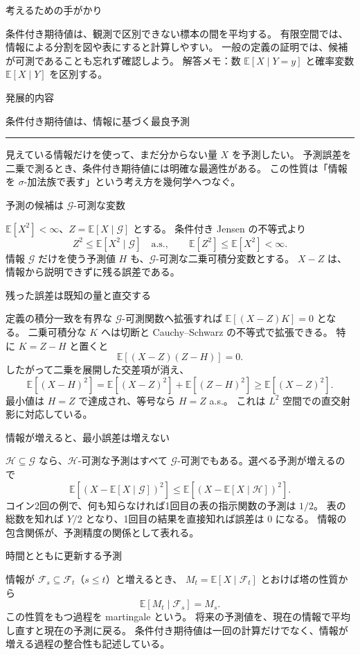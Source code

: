 \documentclass[a4paper,10pt,pdflatex,ja=standard,jafont=ipaex-type1,
  magstyle=real,scale=1]{bxjsarticle}
\newcommand{\coursename}{確率論と統計学 I}
\newcommand{\topic}[1]{\par\vspace{5pt}
  {\large\sffamily\mdseries\color{accent}#1}\par\vspace{2pt}}
\newcommand{\columnheading}[1]{\par\vspace{5pt}
  {\fontsize{11pt}{15pt}\selectfont\sffamily\mdseries\color{accent}#1}\par\vspace{2pt}}
\newcommand{\columnstart}[1]{\clearpage
  \setlength{\parskip}{2.5pt}
  \fancyhead[L]{\small\color{ink}\coursename{}・発展的内容}
  {\small\sffamily\mdseries\color{accent}発展的内容}\par\vspace{4pt}
  {\Large\color{ink}#1}\par\vspace{2pt}
  {\color{accent}\rule{\linewidth}{0.7pt}}\par\vspace{4pt}}
\newcommand{\F}{\mathcal F}
\newcommand{\E}{\mathbb E}
\begin{document}
\topic{考えるための手がかり}
条件付き期待値は、観測で区別できない標本の間を平均する。
有限空間では、情報による分割を図や表にすると計算しやすい。
一般の定義の証明では、候補が可測であることも忘れず確認しよう。
\vfill
{\small\color{muted}解答メモ：数 $\E[X\mid Y=y]$ と確率変数 $\E[X\mid Y]$ を区別する。}

\columnstart{条件付き期待値は、情報に基づく最良予測}
見えている情報だけを使って、まだ分からない量 $X$ を予測したい。
予測誤差を二乗で測るとき、条件付き期待値には明確な最適性がある。
この性質は「情報を $\sigma$-加法族で表す」という考え方を幾何学へつなぐ。

\columnheading{予測の候補は $\mathcal G$-可測な変数}
$\E[X^2]<\infty$、$Z=\E[X\mid\mathcal G]$ とする。
条件付き Jensen の不等式より
$$Z^2\le\E[X^2\mid\mathcal G]\quad\text{a.s.},\qquad
 \E[Z^2]\le\E[X^2]<\infty.$$
情報 $\mathcal G$ だけを使う予測値 $H$ も、$\mathcal G$-可測な二乗可積分変数とする。
$X-Z$ は、情報から説明できずに残る誤差である。

\columnheading{残った誤差は既知の量と直交する}
定義の積分一致を有界な $\mathcal G$-可測関数へ拡張すれば
$\E[(X-Z)K]=0$ となる。
二乗可積分な $K$ へは切断と Cauchy--Schwarz の不等式で拡張できる。
特に $K=Z-H$ と置くと
$$\E[(X-Z)(Z-H)]=0.$$
したがって二乗を展開した交差項が消え、
$$\E[(X-H)^2]=\E[(X-Z)^2]+\E[(Z-H)^2]
 \ge\E[(X-Z)^2].$$
最小値は $H=Z$ で達成され、等号なら $H=Z$ a.s.。
これは $L^2$ 空間での直交射影に対応している。

\columnheading{情報が増えると、最小誤差は増えない}
$\mathcal H\subseteq\mathcal G$ なら、$\mathcal H$-可測な予測はすべて
$\mathcal G$-可測でもある。選べる予測が増えるので
$$\E[(X-\E[X\mid\mathcal G])^2]
 \le\E[(X-\E[X\mid\mathcal H])^2].$$
コイン2回の例で、何も知らなければ1回目の表の指示関数の予測は $1/2$。
表の総数を知れば $Y/2$ となり、1回目の結果を直接知れば誤差は $0$ になる。
情報の包含関係が、予測精度の関係として表れる。

\columnheading{時間とともに更新する予測}
情報が $\F_s\subseteq\F_t$（$s\le t$）と増えるとき、
$M_t=\E[X\mid\F_t]$ とおけば塔の性質から
$$\E[M_t\mid\F_s]=M_s.$$
この性質をもつ過程を martingale という。
将来の予測値を、現在の情報で平均し直すと現在の予測に戻る。
条件付き期待値は一回の計算だけでなく、情報が増える過程の整合性も記述している。

\label{lastpage}
\end{document}

